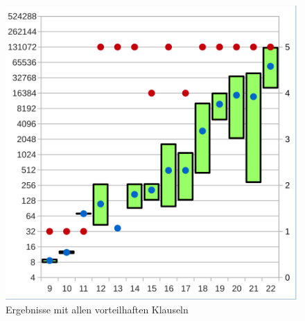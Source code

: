\begin{figure}[!h]
\begin{minipage}[c]{0.45\textwidth}
  \includegraphics[scale=0.55]{images/data_final_xor}
  \end{minipage}
  \caption{Ergebnisse mit allen vorteilhaften Klauseln}
  \label{fig:data_final}
\end{figure}